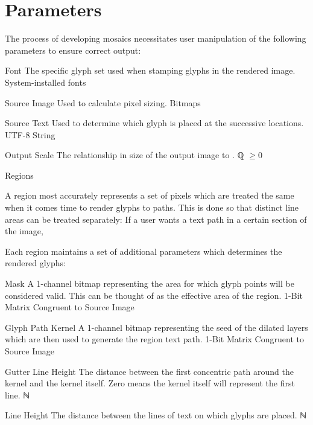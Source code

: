 \section{Parameters}
\label{apx:userparams}
The process of developing mosaics necessitates user manipulation of the following parameters to ensure correct output:
\begin{itemize}
  \paritem
  {Font}
  {The specific glyph set used when stamping glyphs in the rendered image.  }
  {System-installed fonts}
  {\FontParSymbol}

  \paritem
  {Source Image}
  {Used to calculate pixel sizing.}
  {Bitmaps}
  {\SrcImgParSymbol}

  \paritem
  {Source Text}
  {Used to determine which glyph is placed at the successive locations.}
  {UTF-8 String}
  {\SrcTxtParSymbol}

  \paritem
  {Output Scale}
  {The relationship in size of the output image to \SrcImgParSymbol.}
  {ℚ \(\geq 0\)}
  {\OutSclParSymbol}

  \pbodyitem
  {Regions}
  {
    \label{apx:regparams}
    A region most accurately represents a set of pixels which are treated the same when it comes time to render glyphs to paths.
    This is done so that distinct line areas can be treated separately:  If a user wants a text path in a certain section of the image,

    Each region maintains a set of additional parameters which determines the rendered glyphs:
    \begin{itemize}
      \paritem
      {Mask}
      {A 1-channel bitmap representing the area for which glyph points will be considered valid.
        This can be thought of as the effective area of the region.}
      {1-Bit Matrix Congruent to Source Image}
      {\RegMskParSymbol}
      
      \paritem
      {Glyph Path Kernel}
      {A 1-channel bitmap representing the seed of the dilated layers which are then used to generate the region text path.}
      {1-Bit Matrix Congruent to Source Image}
      {\GlyphPathKernelParSymbol}

      \paritem
      {Gutter Line Height}
      {The distance between the first concentric path around the kernel and the kernel itself.
        Zero means the kernel itself will represent the first line.}
      {ℕ}
      {\GtrHtParSymbol}

      \paritem
      {Line Height}
      {The distance between the lines of text on which glyphs are placed.}
      {ℕ}
      {\LnHtParSymbol}


\end{itemize}}
\end{itemize}

